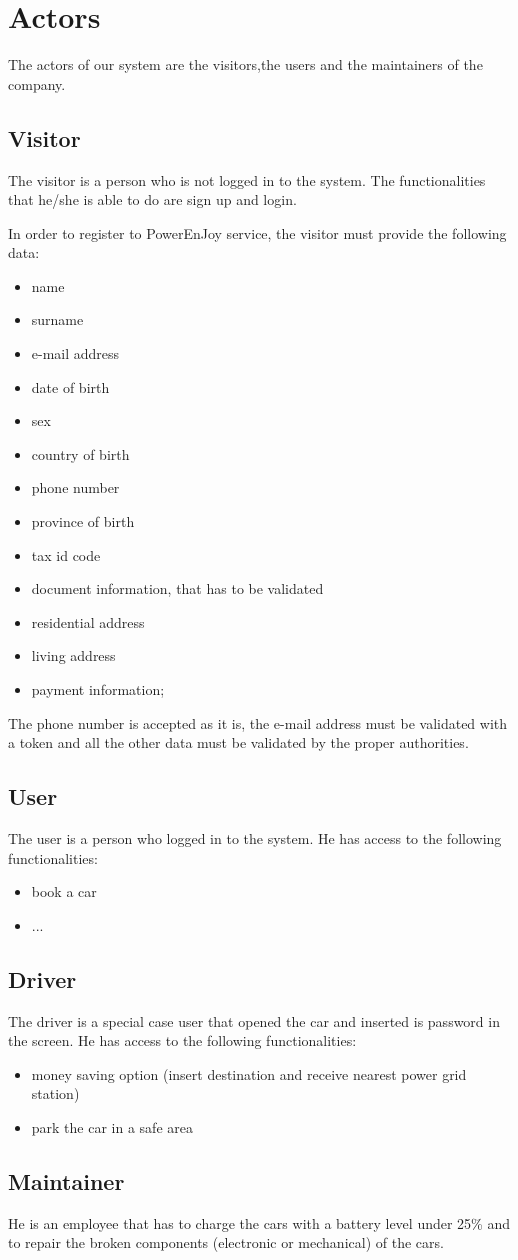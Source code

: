 \section{Actors}
The actors of our system are the visitors,the users and the maintainers of the company.

\subsection{Visitor}
The visitor is a person who is not logged in to the system. The functionalities that he/she is able to do are sign up and login.

In order to register to PowerEnJoy service, the visitor must provide the following data:
\begin{itemize}
	\item name
	\item surname
	\item e-mail address
	\item date of birth
	\item sex
	\item country of birth
	\item phone number
	\item province of birth
	\item tax id code %
	\item document information, that has to be validated
	\item residential address
	\item living address
	\item payment information;
\end{itemize}

The phone number is accepted as it is, the e-mail address must be validated with a token and all
the other data must be validated by the proper authorities.

\subsection{User}
The user is a person who logged in to the system. He has access to the following functionalities:
\begin{itemize}
	\item book a car
	\item ...
\end{itemize}

\subsection{Driver}
The driver is a special case user that opened the car and inserted is password in the screen. He has access to the following functionalities:
\begin{itemize}
	\item money saving option (insert destination and receive nearest power grid station)
	\item park the car in a safe area
\end{itemize}

\subsection{Maintainer}
He is an employee that has to charge the cars with a battery level under 25\% and to repair the broken components (electronic or mechanical) of the cars.
